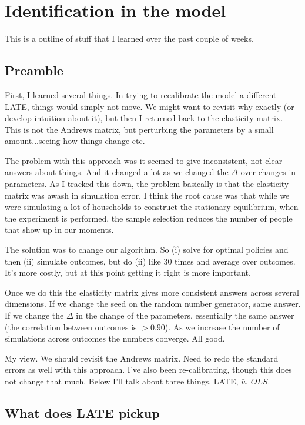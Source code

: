 \documentclass[pdftex,11pt]{article}
\begin{document}
\section{Identification in the model}

This is a outline of stuff that I learned over the past couple of weeks.

\subsection{Preamble}

First, I learned several things. In trying to recalibrate the model a different LATE, things would simply not move. We might want to revisit why exactly (or develop intuition about it), but then I returned back to the elasticity matrix. This is not the Andrews matrix, but perturbing the parameters by a small amount...seeing how things change etc.

The problem with this approach was it seemed to give inconsistent, not clear answers about things. And it changed a lot as we changed the $\Delta$  over changes in parameters. As I tracked this down, the problem basically is  that the elasticity matrix was awash in simulation error. I think the root cause was that while we were simulating a lot of households to construct the stationary equilibrium, when the experiment is performed, the sample selection reduces the number of people that show up in our moments.

The solution was to change our algorithm. So (i) solve for optimal policies and then (ii) simulate outcomes, but do (ii) like 30 times and average over outcomes. It's more costly, but at this point getting it right is more important.

Once we do this the elasticity matrix gives more consistent answers across several dimensions. If we change the seed on the random number generator, same answer. If we change the $\Delta$ in the change of the parameters, essentially the same answer (the correlation between outcomes is $> 0.90$). As we increase the number of simulations across outcomes the numbers converge. All good.

My view. We should revisit the Andrews matrix. Need to redo the standard errors as well with this approach. I've also been re-calibrating, though this does not change that much.  Below I'll talk about three things. LATE, $\bar u$, $OLS$.

\subsection{What does LATE pickup}
\end{document}
